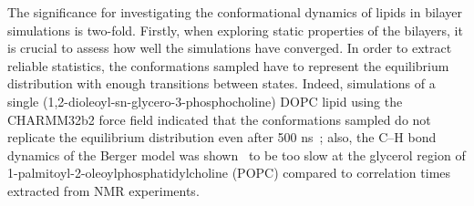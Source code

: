 \documentclass[journal=jpcbfk,manuscript=article,layout=twocolumn]{achemso}
\begin{document}

The significance for investigating the conformational dynamics of lipids in bilayer simulations is two-fold. Firstly, when exploring static properties of the bilayers, it is crucial to assess how well the simulations have converged. In order to extract reliable statistics, the conformations sampled have to represent the equilibrium distribution with enough transitions between states. Indeed, simulations of a single (1,2-dioleoyl-sn-glycero-3-phosphocholine) DOPC lipid using the CHARMM32b2 force field indicated that the conformations sampled do not replicate the equilibrium distribution even after 500 ns~\cite{vogel12}; also, the C--H bond dynamics of the Berger model was shown~\cite{ferreira15} to be too slow at the glycerol region of 1-palmitoyl-2-oleoylphosphatidylcholine (POPC) compared to correlation times extracted from NMR experiments. 
\end{document}
